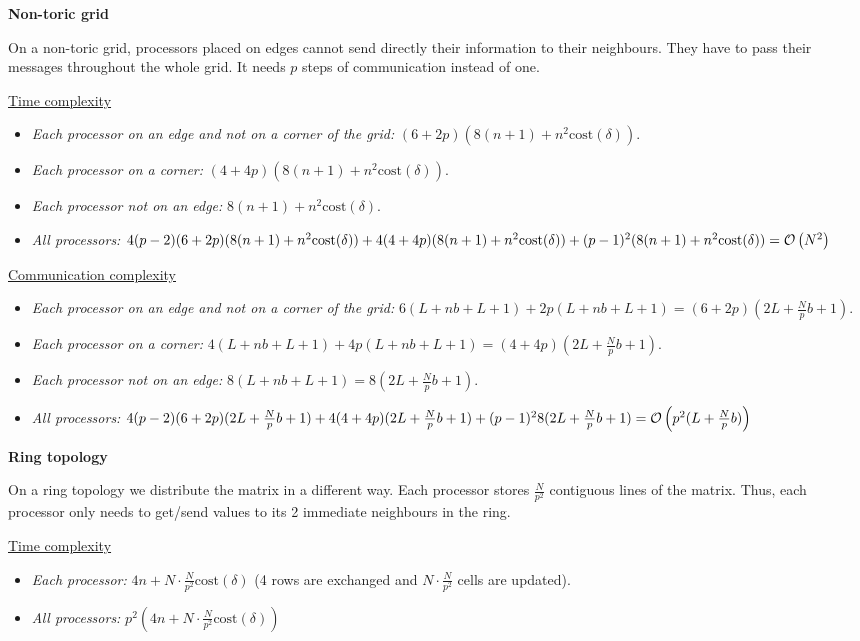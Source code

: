 \textbf{\large{Non-toric grid}}

On a non-toric grid, processors placed on edges cannot send directly their information to their neighbours. They have to pass their messages throughout the whole grid. It needs $p$ steps of communication instead of one.

\underline{Time complexity}
\begin{itemize}
 \item \textit{Each processor on an edge and not on a corner of the grid:} $(6+2p)(8(n+1) + n^2 \text{cost}(\delta))$.
 \item \textit{Each processor on a corner:} $(4+4p)(8(n+1) + n^2 \text{cost}(\delta))$.
 \item \textit{Each processor not on an edge:} $8(n+1) + n^2 \text{cost}(\delta)$.
 \item \textit{All processors:} $4(p-2)(6+2p)(8(n+1) + n^2 \text{cost}(\delta)) + 4(4+4p)(8(n+1) + n^2 \text{cost}(\delta)) + (p-1)^2 (8(n+1) + n^2 \text{cost}(\delta)) = \mathcal O \left( N^2 \right)$
\end{itemize}

\underline{Communication complexity}
\begin{itemize}
 \item \textit{Each processor on an edge and not on a corner of the grid:} $6(L+nb+L+1) + 2p(L+nb+L+1) = (6+2p)(2L+\frac{N}{p}b+1)$.
 \item \textit{Each processor on a corner:} $4(L+nb+L+1) + 4p(L+nb+L+1) = (4+4p)(2L+\frac{N}{p}b+1)$.
 \item \textit{Each processor not on an edge:} $8(L+nb+L+1) = 8(2L+\frac{N}{p}b+1)$.
 \item \textit{All processors:} $4(p-2)(6+2p)(2L+\frac{N}{p}b+1) + 4(4+4p)(2L+\frac{N}{p}b+1) + (p-1)^2 8(2L+\frac{N}{p}b+1) = \mathcal O \left( p^2 (L + \frac{N}{p}b) \right)$
\end{itemize}

\textbf{\large{Ring topology}}

On a ring topology we distribute the matrix in a different way. Each processor stores $\frac{N}{p^2}$ contiguous lines of the matrix. Thus, each processor only needs to get/send values to its 2 immediate neighbours in the ring.

\underline{Time complexity}
\begin{itemize}
 \item \textit{Each processor:} $4n + N \cdot \frac{N}{p^2} \text{cost}(\delta)$ (4 rows are exchanged and $N \cdot \frac{N}{p^2}$ cells are updated).
 \item \textit{All processors:} $p^2 (4n + N \cdot \frac{N}{p^2} \text{cost}(\delta))$
\end{itemize}

